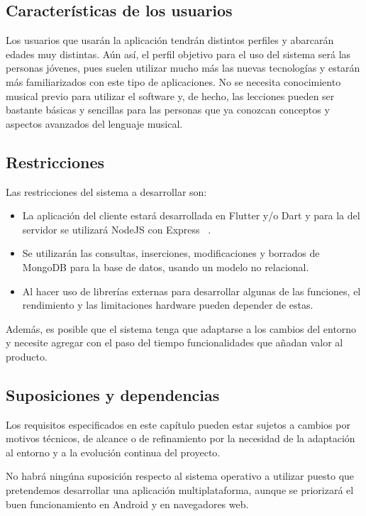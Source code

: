 \subsection{Características de los usuarios}
Los usuarios que usarán la aplicación tendrán distintos perfiles y abarcarán edades muy distintas. Aún así,
el perfil objetivo para el uso del sistema será las personas jóvenes, pues suelen utilizar mucho más las nuevas tecnologías
y estarán más familiarizados con este tipo de aplicaciones. No se necesita conocimiento musical previo para utilizar el software y,
de hecho, las lecciones pueden ser bastante básicas y sencillas para las personas que ya conozcan conceptos y aspectos avanzados del lenguaje musical.


\subsection{Restricciones}

Las restricciones del sistema a desarrollar son:
\begin{itemize}
    \item La aplicación del cliente estará desarrollada en Flutter y/o Dart y para la del servidor se utilizará NodeJS con Express ~\cite{express}.
    \item Se utilizarán las consultas, inserciones, modificaciones y borrados de MongoDB para la base de datos, usando un modelo no relacional.
    \item Al hacer uso de librerías externas para desarrollar algunas de las funciones, el rendimiento y las limitaciones hardware pueden depender de estas.
\end{itemize}


Además, es posible que el sistema tenga que adaptarse a los cambios del entorno y necesite agregar con el paso del tiempo funcionalidades que añadan valor
al producto.


\subsection{Suposiciones y dependencias}
Los requisitos especificados en este capítulo pueden estar sujetos a cambios por motivos técnicos, de alcance o de refinamiento por la necesidad de la adaptación
al entorno y a la evolución continua del proyecto.

No habrá ningúna suposición respecto al sistema operativo a utilizar puesto que pretendemos desarrollar una aplicación multiplataforma, aunque se priorizará el buen funcionamiento en Android y en navegadores web.


